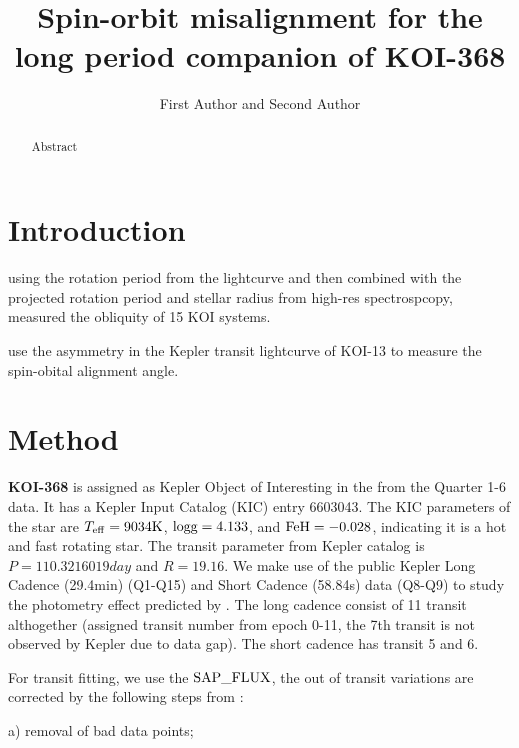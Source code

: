 \documentclass[preprint]{emulateapj}
\makeatletter
\newcommand{\myemail}{email@email.com}
\makeatother
\begin{document}
\linenumbers

\title{Spin-orbit misalignment for the long period companion of KOI-368}

\author{First Author and
Second Author}

\altaffiltext{1}{Affil2; \email{\myemail}}

\begin{abstract}
Abstract
\end{abstract}


\section{Introduction}
\label{sec:introduction}

\citet{Hirano:2012} 
using the rotation period from the lightcurve and 
then combined with the projected rotation period and stellar radius from 
high-res spectrospcopy, measured the obliquity of 15 KOI systems. 

\citet{Barnes:2011} use the asymmetry in the Kepler transit lightcurve of KOI-13 
to measure the spin-obital alignment angle. 

\section{Method}
\label{sec:method}

{\bf KOI-368} is assigned as Kepler Object of Interesting in the 
\citep{Batalha:2013} from the Quarter 1-6 data. It has a Kepler Input Catalog (KIC) 
entry 6603043. The KIC parameters of the star are $T_{\rm eff} = 9034 {\rm K}$,  
$\rm logg=4.133$, and $\rm FeH = -0.028$, indicating it is a hot and 
fast rotating star. The transit parameter from Kepler catalog is 
$P = 110.3216019 day$ and $R=19.16$\rearth.
We make use of the public Kepler Long Cadence (29.4min) (Q1-Q15) and 
Short Cadence (58.84s) data (Q8-Q9) to study the photometry effect 
predicted by \citet{Barnes:2009}.
The long cadence \lcs consist of 11 transit althogether (assigned transit 
number from epoch 0-11, the 7th transit is not observed by Kepler due to data gap). 
The short cadence \lcs has transit 5 and 6. 

For transit fitting, we use the $\rm SAP\_FLUX$, the out of transit 
variations are corrected by the following steps from \citet{Huang:2013}:

a) removal of bad data points;
\end{document}
